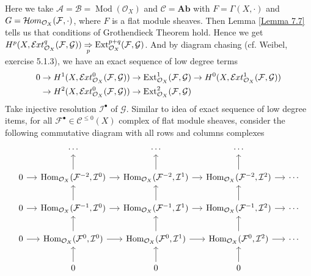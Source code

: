 \documentclass{ctexart}
\renewcommand{\hom}{\operatorname{Hom}}
\newcommand{\ext}{\operatorname{Ext}}
\newcommand{\sheafhom}{\mathcal{H}\kern -.5pt om}
\newcommand{\sheafext}{\mathcal{E}\kern -.5pt xt}
\newcommand{\abeliangroups}{\mathbf{Ab}}
\newcommand{\module}{\operatorname{Mod}}
\begin{document}
Here we take $\mathscr{A} = \mathscr{B} = \module (\mathcal{O}_{X})$ and $\mathscr{C} = \abeliangroups$ with $F = \Gamma(X, \cdot)$ and $G = \sheafhom_{\mathcal{O}_{X}}(\mathcal{F}, \cdot)$, where $F$ is a flat module sheaves.
Then Lemma \ref{Lemma 7.7} tells us that conditions of Grothendieck Theorem hold. 
Hence we get $H^{p}(X, \sheafext_{\mathcal{O}_{X}}^{q}(\mathcal{F}, \mathcal{G})) \underset{p}{\Rightarrow} \ext_{\mathcal{O}_{X}}^{p + q}(\mathcal{F}, \mathcal{G})$.
And by diagram chasing (cf. Weibel, exercise 5.1.3), we have an exact sequence of low degree terms
\begin{equation}
    \begin{split}
            0 & \rightarrow H^{1}(X, \sheafext_{\mathcal{O}_{X}}^{0}(\mathcal{F}, \mathcal{G})) \rightarrow \ext_{\mathcal{O}_{X}}^{1}(\mathcal{F}, \mathcal{G}) \rightarrow H^{0}(X, \sheafext_{\mathcal{O}_{X}}^{1}(\mathcal{F}, \mathcal{G})) \\
            & \rightarrow H^{2}(X, \sheafext_{\mathcal{O}_{X}}^{0}(\mathcal{F}, \mathcal{G})) \rightarrow \ext_{\mathcal{O}_{X}}^{2}(\mathcal{F}, \mathcal{G}) 
    \end{split}
\end{equation}
Take injective resolution $\mathcal{I}^{\bullet}$ of $\mathcal{G}$.
Similar to idea of exact sequence of low degree items, for all $\mathcal{F}^{\bullet}\in \mathcal{C}^{\le 0}(X)$ complex of flat module sheaves,
consider the following commutative diagram with all rows and columns complexes
\begin{equation}
    \begin{tikzcd}[column sep = small]
        & \cdots &
        \cdots &
        \cdots & \\
        0 \arrow[r] &
        \hom_{\mathcal{O}_{X}}(\mathcal{F}^{-2}, \mathcal{I}^{0}) \arrow[u] \arrow[r] &
        \hom_{\mathcal{O}_{X}}(\mathcal{F}^{-2}, \mathcal{I}^{1}) \arrow[u] \arrow[r] &
        \hom_{\mathcal{O}_{X}}(\mathcal{F}^{-2}, \mathcal{I}^{2}) \arrow[u] \arrow[r] &
        \cdots \\
        0 \arrow[r] &
        \hom_{\mathcal{O}_{X}}(\mathcal{F}^{-1}, \mathcal{I}^{0}) \arrow[u] \arrow[r] &
        \hom_{\mathcal{O}_{X}}(\mathcal{F}^{-1}, \mathcal{I}^{1}) \arrow[u] \arrow[r] &
        \hom_{\mathcal{O}_{X}}(\mathcal{F}^{-1}, \mathcal{I}^{2}) \arrow[u] \arrow[r] &
        \cdots \\
        0 \arrow[r] &
        \hom_{\mathcal{O}_{X}}(\mathcal{F}^{0}, \mathcal{I}^{0}) \arrow[u] \arrow[r] &
        \hom_{\mathcal{O}_{X}}(\mathcal{F}^{0}, \mathcal{I}^{1}) \arrow[u] \arrow[r] &
        \hom_{\mathcal{O}_{X}}(\mathcal{F}^{0}, \mathcal{I}^{2}) \arrow[u] \arrow[r] &
        \cdots \\
        & 0 \arrow[u] &
        0 \arrow[u] &
        0 \arrow[u] &
    \end{tikzcd}
\end{equation}
\end{document}
